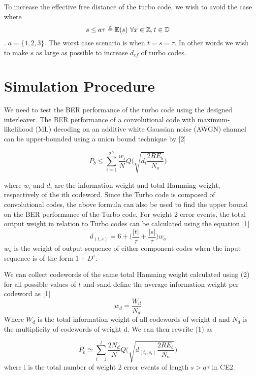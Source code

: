 \documentclass[20 pts]{article}
\begin{document}
To increase the effective free distance of the turbo code, we wish to avoid the case where $$s \leq a\tau \triangleq \mathbb{E}(s) \\\\\ \forall x \in \mathbb{Z} , t \in \mathbb{D}$$.
$a=\{1,2,3\}$. The worst case scenario is when $t = s =\tau$. In other words we wish to make $s$ as large as possible to increase $d_{ef}$ of turbo codes.

\section{Simulation Procedure}
We need to test the BER performance of the turbo code using the designed interleaver. The BER performance of a convolutional code with maximum-likelihood (ML) decoding on an additive white Gaussian noise (AWGN) channel can be upper-bounded using a union bound technique by [2]

\begin{equation}
P_b \leq \sum_{i=1}^{2^N} \frac{w_i}{N}Q\Bigg( \sqrt{d_i\frac{2RE_b}{N_o}}\Bigg)
\end{equation}

where $w_i$ and $d_i$ are the information weight and total Hamming weight, respectively of the ith codeword. Since the Turbo code is composed of convolutional codes, the above formula can also be used to find the upper bound on the BER performance of the Turbo code. For weight 2 error events, the total output weight in relation to Turbo codes can be calculated using the equation [1]
\begin{equation}
d_{(t,s)}=6+\Bigg( \frac{ \left|t\right|}{\tau} + \frac{ \left|s\right|}{\tau} \Bigg)w_o
\end{equation}
$w_o$ is the weight of output sequence of either component codes when the input sequence is of the form $1+D^\tau$. 

We can collect codewords of the same total Hamming weight calculated using (2) for all possible values of $t$ and $s$and define the average information weight per codeword as [1]
$$ w_d=\frac{W_d}{N_d}$$
Where $W_d$ is the total information weight of all codewords of weight  d and $N_d$ is the multiplicity of codewords of weight d. We can then rewrite (1) as 

\begin{equation}
P_b \simeq \sum_{i=1}^{l} \frac{2N_d}{N}Q\Bigg( \sqrt{d_{(t_i,s_i)}\frac{2RE_b}{N_o}}\Bigg)
\end{equation}
where l is the total number of weight 2 error events of length $s>a\tau$ in CE2. 
\end{document}
